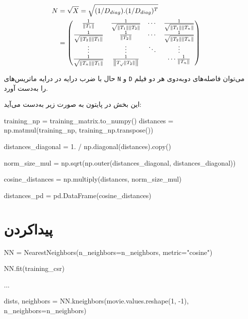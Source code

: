 \begin{latin}
    \begin{equation}
    \begin{aligned}
      N &= \sqrt{X} = \sqrt{(1/D_{diag}).(1/D_{diag})^{T}} \\
      &= \begin{pmatrix}
          \frac{1} {\left\lVert T_{1}\right\rVert} & \frac{1}{\sqrt{\left\lVert T_{1}\right\rVert\left\lVert T_{2}\right\rVert}} & \cdots & \frac{1}{\sqrt{\left\lVert T_{1}\right\rVert\left\lVert T_{n}\right\rVert}} \\
          \frac{1}{\sqrt{\left\lVert T_{2}\right\rVert\left\lVert T_{1}\right\rVert}} & \frac{1}{\left\lVert T_{2}\right\rVert} & \cdots & \frac{1}{\sqrt{\left\lVert T_{2}\right\rVert\left\lVert T_{n}\right\rVert}} \\
        \vdots  & \vdots  & \ddots & \vdots  \\
          \frac{1}{\sqrt{\left\lVert T_{n}\right\rVert\left\lVert T_{1}\right\rVert}} & \frac{1}{\left\lVert T_{\sqrt{}}\left\lVert T_{2}\right\rVert\right\rVert} & & \cdots \frac{1}{\left\lVert T_{n}\right\rVert} \\
        \end{pmatrix} \\
    \end{aligned}
    \end{equation}
\end{latin}

حال با ضرب درایه در درایه ماتریس‌های
\verb;N;
و
\verb;D;
می‌توان فاصله‌های دوبه‌دو‌ی هر دو فیلم را به‌دست آورد.

این بخش در پایتون به صورت زیر به‌دست می‌آید:

\begin{latin}
  \begin{python}
training_np = training_matrix.to_numpy()
distances = np.matmul(training_np, training_np.transpose())

distances_diagonal = 1. / np.diagonal(distances).copy()

norm_size_mul = np.sqrt(np.outer(distances_diagonal, distances_diagonal))

cosine_distances = np.multiply(distances, norm_size_mul)

distances_pd = pd.DataFrame(cosine_distances)

  \end{python}
\end{latin}

\section{پیداکردن }

\begin{latin}
  \begin{python}
NN = NearestNeighbors(n_neighbors=n_neighbors, metric="cosine")

NN.fit(training_csr)

...

dists, neighbors = NN.kneighbors(movie.values.reshape(1, -1), n_neighbors=n_neighbors)

  \end{python}
\end{latin}


